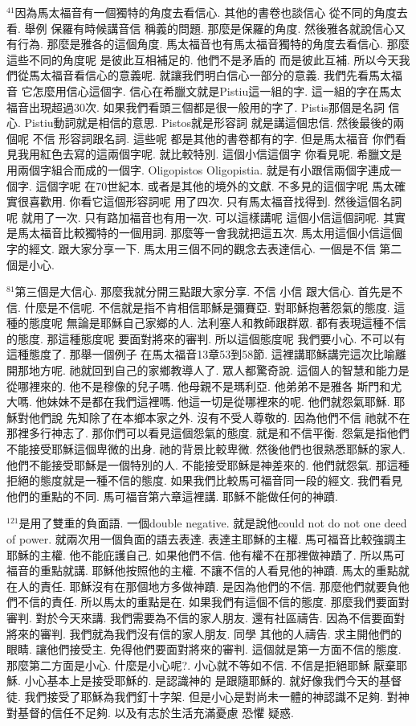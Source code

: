 \documentclass{book}
\begin{document}
$^{41}$因為馬太福音有一個獨特的角度去看信心.
其他的書卷也談信心 從不同的角度去看.
舉例 保羅有時候講音信 稱義的問題.
那麼是保羅的角度.
然後雅各就說信心又有行為.
那麼是雅各的這個角度.
馬太福音也有馬太福音獨特的角度去看信心.
那麼這些不同的角度呢 是彼此互相補足的.
他們不是矛盾的 而是彼此互補.
所以今天我們從馬太福音看信心的意義呢.
就讓我們明白信心一部分的意義.
我們先看馬太福音 它怎麼用信心這個字.
信心在希臘文就是Pistiu這一組的字.
這一組的字在馬太福音出現超過30次.
如果我們看頭三個都是很一般用的字了.
Pistis那個是名詞 信心.
Pistiu動詞就是相信的意思.
Pistos就是形容詞 就是講這個忠信.
然後最後的兩個呢 不信 形容詞跟名詞.
這些呢 都是其他的書卷都有的字.
但是馬太福音 你們看見我用紅色去寫的這兩個字呢.
就比較特別.
這個小信這個字 你看見呢.
希臘文是用兩個字組合而成的一個字.
Oligopistos Oligopistia.
就是有小跟信兩個字連成一個字.
這個字呢 在70世紀本.
或者是其他的境外的文獻.
不多見的這個字呢 馬太確實很喜歡用.
你看它這個形容詞呢 用了四次.
只有馬太福音找得到.
然後這個名詞呢 就用了一次.
只有路加福音也有用一次.
可以這樣講呢 這個小信這個詞呢.
其實是馬太福音比較獨特的一個用詞.
那麼等一會我就把這五次.
馬太用這個小信這個字的經文.
跟大家分享一下.
馬太用三個不同的觀念去表達信心.
一個是不信 第二個是小心.

$^{81}$第三個是大信心.
那麼我就分開三點跟大家分享.
不信 小信 跟大信心.
首先是不信.
什麼是不信呢.
不信就是指不肯相信耶穌是彌賽亞.
對耶穌抱著怨氣的態度.
這種的態度呢 無論是耶穌自己家鄉的人.
法利塞人和教師跟群眾.
都有表現這種不信的態度.
那這種態度呢 要面對將來的審判.
所以這個態度呢 我們要小心.
不可以有這種態度了.
那舉一個例子 在馬太福音13章53到58節.
這裡講耶穌講完這次比喻離開那地方呢.
祂就回到自己的家鄉教導人了.
眾人都驚奇說.
這個人的智慧和能力是從哪裡來的.
他不是穆像的兒子嗎.
他母親不是瑪利亞.
他弟弟不是雅各 斯門和尤大嗎.
他妹妹不是都在我們這裡嗎.
他這一切是從哪裡來的呢.
他們就怨氣耶穌.
耶穌對他們說 先知除了在本鄉本家之外.
沒有不受人尊敬的.
因為他們不信 祂就不在那裡多行神志了.
那你們可以看見這個怨氣的態度.
就是和不信平衡.
怨氣是指他們不能接受耶穌這個卑微的出身.
祂的背景比較卑微.
然後他們也很熟悉耶穌的家人.
他們不能接受耶穌是一個特別的人.
不能接受耶穌是神差來的.
他們就怨氣.
那這種拒絕的態度就是一種不信的態度.
如果我們比較馬可福音同一段的經文.
我們看見他們的重點的不同.
馬可福音第六章這裡講.
耶穌不能做任何的神蹟.

$^{121}$是用了雙重的負面語.
一個double negative.
就是說他could not do not one deed of power.
就兩次用一個負面的語去表達.
表達主耶穌的主權.
馬可福音比較強調主耶穌的主權.
他不能庇護自己.
如果他們不信.
他有權不在那裡做神蹟了.
所以馬可福音的重點就講.
耶穌他按照他的主權.
不讓不信的人看見他的神蹟.
馬太的重點就在人的責任.
耶穌沒有在那個地方多做神蹟.
是因為他們的不信.
那麼他們就要負他們不信的責任.
所以馬太的重點是在.
如果我們有這個不信的態度.
那麼我們要面對審判.
對於今天來講.
我們需要為不信的家人朋友.
還有社區禱告.
因為不信要面對將來的審判.
我們就為我們沒有信的家人朋友.
同學 其他的人禱告.
求主開他們的眼睛.
讓他們接受主.
免得他們要面對將來的審判.
這個就是第一方面不信的態度.
那麼第二方面是小心.
什麼是小心呢?.
小心就不等如不信.
不信是拒絕耶穌 厭棄耶穌.
小心基本上是接受耶穌的.
是認識神的 是跟隨耶穌的.
就好像我們今天的基督徒.
我們接受了耶穌為我們釘十字架.
但是小心是對尚未一體的神認識不足夠.
對神 對基督的信任不足夠.
以及有志於生活充滿憂慮 恐懼 疑惑.
\end{document}
